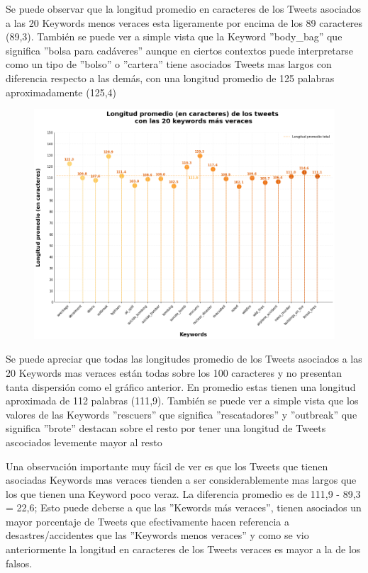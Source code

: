 \documentclass[titlepage,a4paper]{article}
\begin{document}
    Se puede observar que la longitud promedio en caracteres de los Tweets asociados a las 20 Keywords menos veraces esta ligeramente por encima de los 89 caracteres (89,3). También se puede ver a simple vista que la Keyword ''body\_bag'' que significa ''bolsa para cadáveres'' aunque en ciertos contextos puede interpretarse como un tipo de ''bolso'' o ''cartera'' tiene asociados Tweets mas largos con diferencia respecto a las demás, con una longitud promedio de 125 palabras aproximadamente (125,4) 
    
    \begin{figure}[H]
    \centering
    \includegraphics[width=1\textwidth]{graficos/Analisis de Keyword/long_prom_char_keywords_veraces.png}
    \caption{} 
    \end{figure}
    
    Se puede apreciar que todas las longitudes promedio de los Tweets asociados a las 20 Keywords mas veraces están todas sobre los 100 caracteres y no presentan tanta dispersión como el gráfico anterior. En promedio estas tienen una longitud aproximada de 112 palabras (111,9). También se puede ver a simple vista que los valores de las Keywords ''rescuers'' que significa ''rescatadores'' y ''outbreak'' que significa ''brote'' destacan sobre el resto por tener una longitud de Tweets ascociados levemente mayor al resto  
    
    Una observación importante muy fácil de ver es que los Tweets que tienen asociadas Keywords mas veraces tienden a ser considerablemente mas largos que los que tienen una Keyword poco veraz. La diferencia promedio es de 111,9 - 89,3 = 22,6; Esto puede deberse a que las ''Kewords más veraces'', tienen asociados un mayor porcentaje de Tweets que efectivamente hacen referencia a desastres/accidentes que las ''Keywords menos veraces'' y como se vio anteriormente la longitud en caracteres de los Tweets veraces es mayor a la de los falsos.
    
\end{document}
